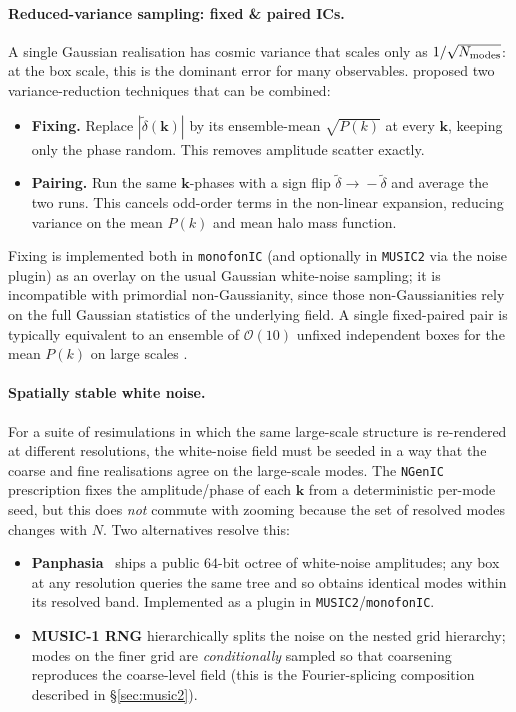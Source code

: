 \documentclass[12pt]{article}
\newcommand{\bk}{\mathbf{k}}
\begin{document}
\paragraph{Reduced-variance sampling: fixed \& paired ICs.}
A single Gaussian realisation has cosmic variance that scales only as
$1/\sqrt{N_{\rm modes}}$: at the box scale, this is the dominant error
for many observables.  \citet{Angulo2016} proposed two variance-reduction
techniques that can be combined:
%
\begin{itemize}
  \item \textbf{Fixing.}  Replace $|\tilde\delta(\bk)|$ by its
        ensemble-mean $\sqrt{P(k)}$ at every $\bk$, keeping only the
        phase random.  This removes amplitude scatter exactly.
  \item \textbf{Pairing.}  Run the same $\bk$-phases with a sign flip
        $\tilde\delta \!\to\! -\tilde\delta$ and average the two runs.
        This cancels odd-order terms in the non-linear expansion,
        reducing variance on the mean $P(k)$ and mean halo mass
        function.
\end{itemize}
%
Fixing is implemented both in \texttt{monofonIC} (and optionally in
\texttt{MUSIC2} via the noise plugin) as an overlay on the usual
Gaussian white-noise sampling; it is incompatible with primordial
non-Gaussianity, since those non-Gaussianities rely on the full
Gaussian statistics of the underlying field.  A single fixed-paired
pair is typically equivalent to an ensemble of $\mathcal{O}(10)$
unfixed independent boxes for the mean $P(k)$ on large scales
\citep{Angulo2016,Angulo2022}.

\paragraph{Spatially stable white noise.}
For a suite of resimulations in which the same large-scale structure
is re-rendered at different resolutions, the white-noise field must
be seeded in a way that the coarse and fine realisations agree on the
large-scale modes.  The \texttt{NGenIC} prescription fixes the
amplitude/phase of each $\bk$ from a deterministic per-mode seed, but
this does \emph{not} commute with zooming because the set of resolved
modes changes with $N$.  Two alternatives resolve this:
%
\begin{itemize}
  \item \textbf{Panphasia}~\citep{Jenkins2013} ships a public
        $64$-bit octree of white-noise amplitudes; any box at any
        resolution queries the same tree and so obtains identical
        modes within its resolved band.  Implemented as a plugin in
        \texttt{MUSIC2}/\texttt{monofonIC}.
  \item \textbf{MUSIC-1 RNG} hierarchically splits the noise on the
        nested grid hierarchy; modes on the finer grid are
        \emph{conditionally} sampled so that coarsening reproduces the
        coarse-level field (this is the Fourier-splicing composition
        described in \S\ref{sec:music2}).
\end{itemize}
\end{document}
